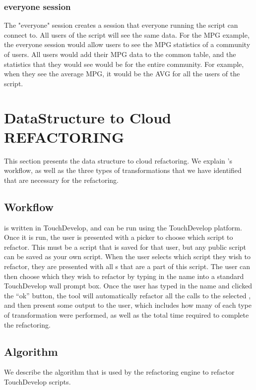 \documentclass{sigplanconf}
\begin{document}
\subsubsection{everyone session}
The "everyone" session creates a session that everyone running the script can connect to.  All users of the script will see the same data.  For the MPG example, the everyone session would allow users to see the MPG statistics of a community of users.  All users would add their MPG data to the common table, and the statistics that they would see would be for the entire community.  For example, when they see the average MPG, it would be the AVG for all the users of the script.



  
\section{DataStructure to Cloud REFACTORING}
\label{sec:Refactoring}
This section presents the data structure to cloud refactoring.  We explain \tool's workflow, as well as the three types of transformations that we have identified that are necessary for the refactoring. 

\subsection{Workflow}
\tool is written in TouchDevelop, and can be run using the TouchDevelop platform.  Once it is run, the user is presented with a picker to choose which script to refactor.  This must be a script that is saved for that user, but any public script can be saved as your own script. When the user selects which script they wish to refactor, they are presented with all \NC{}s that are a part of this script.  The user can then choose which \NC{} they wish to refactor by typing in the name into a standard TouchDevelop wall prompt box. Once the user has typed in the name and clicked the ``ok'' button, the tool will automatically refactor all the calls to the selected \NC{}, and then present some output to the user, which includes how many of each type of transformation were performed, as well as the total time required to complete the refactoring. 


\subsection{Algorithm}
We describe the algorithm that is used by the refactoring engine to refactor TouchDevelop scripts.   
\end{document}

